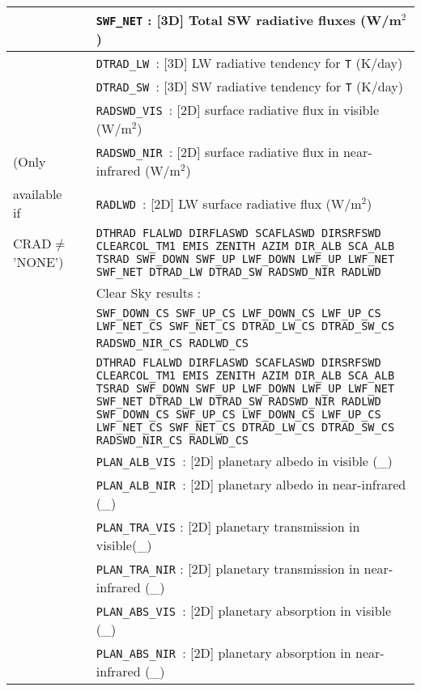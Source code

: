 \begin{center}
\begin{makeimage}
\begin{tabular}{|>{\centering}p{3cm}|>{\centering}p{2.5cm}|p{11cm}|}
& & {\tt SWF\_NET} : [3D] Total SW  radiative fluxes (W/m$^2$)\\\cline{3-3}
& & {\tt DTRAD\_LW }: [3D] LW radiative tendency for {\tt T} (K/day)\\\cline{3-3}
& & {\tt DTRAD\_SW }: [3D] SW radiative tendency for {\tt T} (K/day)\\\cline{3-3}
& & {\tt RADSWD\_VIS }: [2D] surface radiative flux in visible (W/m$^2$)\\\cline{3-3}
(Only& & {\tt RADSWD\_NIR }: [2D] surface radiative flux in near-infrared (W/m$^2$)\\\cline{3-3}
available if & & {\tt RADLWD }: [2D] LW surface radiative flux (W/m$^2$)\\\cline{2-3}
CRAD$\neq$'NONE')&\multirow{8}{*}{2} & {\tt DTHRAD FLALWD DIRFLASWD SCAFLASWD DIRSRFSWD CLEARCOL\_TM1 EMIS ZENITH AZIM DIR\_ALB SCA\_ALB TSRAD SWF\_DOWN SWF\_UP LWF\_DOWN LWF\_UP LWF\_NET SWF\_NET DTRAD\_LW DTRAD\_SW RADSWD\_NIR RADLWD }\\\cline{3-3}
&& Clear Sky results :\\
& &{\tt SWF\_DOWN\_CS SWF\_UP\_CS LWF\_DOWN\_CS LWF\_UP\_CS LWF\_NET\_CS SWF\_NET\_CS DTRAD\_LW\_CS DTRAD\_SW\_CS RADSWD\_NIR\_CS RADLWD\_CS }\ \\\cline{2-3}
&\multirow{13}{*}{3} &{\tt DTHRAD FLALWD DIRFLASWD SCAFLASWD DIRSRFSWD CLEARCOL\_TM1 EMIS ZENITH AZIM DIR\_ALB SCA\_ALB TSRAD SWF\_DOWN SWF\_UP LWF\_DOWN LWF\_UP LWF\_NET SWF\_NET DTRAD\_LW DTRAD\_SW RADSWD\_NIR RADLWD SWF\_DOWN\_CS SWF\_UP\_CS LWF\_DOWN\_CS LWF\_UP\_CS LWF\_NET\_CS SWF\_NET\_CS DTRAD\_LW\_CS DTRAD\_SW\_CS RADSWD\_NIR\_CS RADLWD\_CS  }  \\\cline{3-3}
& & {\tt PLAN\_ALB\_VIS }: [2D] planetary albedo in visible (\_) \\\cline{3-3}
& & {\tt PLAN\_ALB\_NIR }: [2D] planetary albedo  in near-infrared (\_) \\\cline{3-3}
& &{\tt PLAN\_TRA\_VIS} : [2D] planetary transmission in visible(\_) \\\cline{3-3}
& &{\tt PLAN\_TRA\_NIR} : [2D] planetary transmission in near-infrared (\_) \\\cline{3-3}
& & {\tt PLAN\_ABS\_VIS }: [2D]  planetary absorption in visible (\_)\\\cline{3-3}
& & {\tt PLAN\_ABS\_NIR }: [2D]  planetary absorption in  near-infrared (\_)\\\hline
\end{tabular} 
\end{makeimage}
\end{center}

